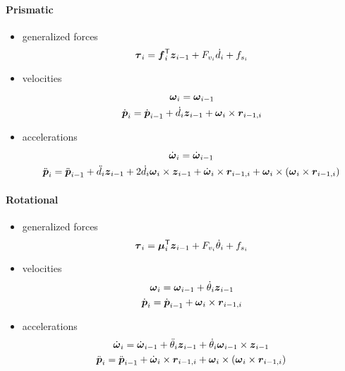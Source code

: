 \paragraph{Prismatic}
\begin{itemize}
	\item generalized forces
	\[ \boldsymbol{\tau}_i = \boldsymbol{f}_i^{\mathsf{T}} \boldsymbol{z}_{i-1} + F_{v_i}\dot{d}_i + f_{s_i} \]

	\item velocities
	\begin{gather*}
		\boldsymbol{\omega}_i = \boldsymbol{\omega}_{i-1} \\
		\dot{\boldsymbol{p}}_i = \dot{\boldsymbol{p}}_{i-1} + \dot{d}_i \boldsymbol{z}_{i-1} + \boldsymbol{\omega}_i \times \boldsymbol{r}_{i-1,i}
	\end{gather*}

	\item accelerations
	\begin{gather*}
		\dot{\boldsymbol{\omega}}_i = \dot{\boldsymbol{\omega}}_{i-1} \\
		\ddot{\boldsymbol{p}}_i = \ddot{\boldsymbol{p}}_{i-1} +
		\ddot{d}_i \boldsymbol{z}_{i-1} + 2\dot d_i \boldsymbol{\omega}_i \times \boldsymbol{z}_{i-1} +
		\dot{\boldsymbol{\omega}}_i \times \boldsymbol{r}_{i-1,i} + \boldsymbol{\omega}_i \times (\boldsymbol{\omega}_i \times \boldsymbol{r}_{i-1,i})
	\end{gather*}
\end{itemize}

\paragraph{Rotational}
\begin{itemize}
	\item generalized forces
	\[ \boldsymbol{\tau}_i = \boldsymbol{\mu}_i^{\mathsf{T}} \boldsymbol{z}_{i-1} + F_{v_i}\dot{\theta}_i + f_{s_i} \]

	\item velocities
	\begin{gather*}
		\boldsymbol{\omega}_i = \boldsymbol{\omega}_{i-1} + \dot{\theta}_i \boldsymbol{z}_{i-1} \\
		\dot{\boldsymbol{p}}_i = \dot{\boldsymbol{p}}_{i-1} + \boldsymbol{\omega}_i \times \boldsymbol{r}_{i-1,i}
	\end{gather*}

	\item accelerations
	\begin{gather*}
		\dot{\boldsymbol{\omega}}_i = \dot{\boldsymbol{\omega}}_{i-1} + \ddot{\theta}_i \boldsymbol{z}_{i-1} + \dot \theta_i \boldsymbol{\omega}_{i-1} \times \boldsymbol{z}_{i-1}\\
		\ddot{\boldsymbol{p}}_i = \ddot{\boldsymbol{p}}_{i-1} +
		\dot{\boldsymbol{\omega}}_i \times \boldsymbol{r}_{i-1,i} + \boldsymbol{\omega}_i \times (\boldsymbol{\omega}_i \times \boldsymbol{r}_{i-1,i})
	\end{gather*}
\end{itemize}

